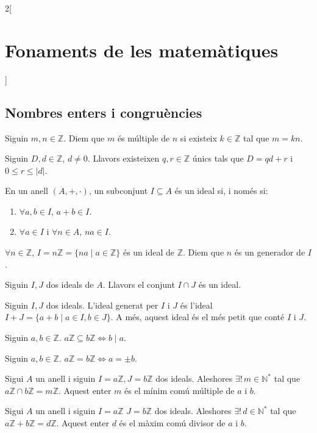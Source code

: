 \documentclass[../../../main.tex]{subfiles}
\begin{document}
\begin{multicols}{2}[\section{Fonaments de les matemàtiques}]
\subsection{Nombres enters i congruències}
\begin{definition}
Siguin $m,n\in\mathbb{Z}$. Diem que $m$ és múltiple de $n$ si existeix $k\in\mathbb{Z}$ tal que $m=kn$.
\end{definition}
\begin{theorem}
Siguin $D,d\in\mathbb{Z}$, $d\ne 0$. Llavors existeixen $q,r\in\mathbb{Z}$ únics tals que $D=qd+r$ i $0\leq r\leq|d|$.
\end{theorem}
\begin{definition}
En un anell $(A,+,\cdot)$, un subconjunt $I\subseteq A$ és un ideal si, i només si:
\begin{enumerate}
    \item $\forall a,b\in I$, $a+b\in I$.
    \item $\forall a\in I$ i $\forall n\in A$, $na\in I$.
\end{enumerate}
\end{definition}
\begin{lemma}
$\forall n\in\mathbb{Z}$, $I=n\mathbb{Z}=\{na\mid a\in\mathbb{Z}\}$ és un ideal de $\mathbb{Z}$. Diem que $n$ és un generador de $I$.
\end{lemma}
\begin{lemma}
Siguin $I,J$ dos ideals de $A$. Llavors el conjunt $I\cap J$ és un ideal.
\end{lemma}
\begin{lemma}
Siguin $I,J$ dos ideals. L'ideal generat per $I$ i $J$ és l'ideal $I+J=\{a+b\mid a\in I,b\in J\}$. A més, aquest ideal és el més petit que conté $I$ i $J$.
\end{lemma}
\begin{prop}
Siguin $a,b\in \mathbb{Z}$. $a\mathbb{Z}\subseteq b\mathbb{Z}\iff b\mid a$.
\end{prop}
\begin{corollary}
Siguin $a,b\in \mathbb{Z}$. $a\mathbb{Z}=b\mathbb{Z}\iff a=\pm b$.
\end{corollary}
\begin{prop}
Sigui $A$ un anell i siguin $I=a\mathbb{Z},J=b\mathbb{Z}$ dos ideals. Aleshores $\exists!\,m\in\mathbb{N}^*$ tal que $a\mathbb{Z}\cap b\mathbb{Z}=m\mathbb{Z}$. Aquest enter $m$ és el mínim comú múltiple de $a$ i $b$.
\end{prop}
\begin{prop}
Sigui $A$ un anell i siguin $I=a\mathbb{Z}$ $J=b\mathbb{Z}$ dos ideals. Aleshores $\exists!\,d\in\mathbb{N}^*$ tal que $a\mathbb{Z}+b\mathbb{Z}=d\mathbb{Z}$. Aquest enter $d$ és el màxim comú divisor de $a$ i $b$.

\end{prop}
\end{multicols}
\end{document}

